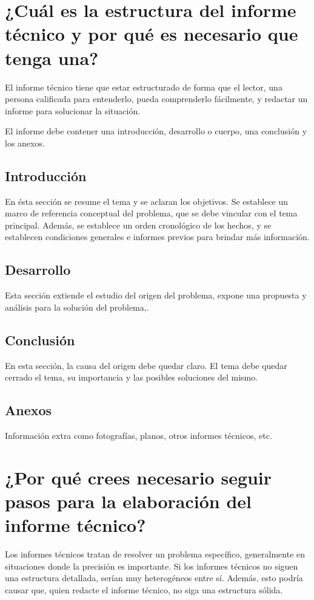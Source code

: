 \documentclass{article}
\begin{document}
\section{¿Cuál es la estructura del informe técnico y por qué es necesario que tenga una?}
El informe técnico tiene que estar estructurado de forma que el lector, una
persona calificada para entenderlo, pueda comprenderlo fácilmente, y redactar
un informe para solucionar la situación.

El informe debe contener una introducción, desarrollo o cuerpo, una conclusión
y los anexos.

\subsection{Introducción}
En ésta sección se resume el tema y se aclaran los objetivos. Se establece un
marco de referencia conceptual del problema, que se debe vincular con el tema
principal. Además, se establece un orden cronológico de los hechos, y se
establecen condiciones generales e informes previos para brindar más
información.

\subsection{Desarrollo}
Esta sección extiende el estudio del origen del problema, expone una propuesta
y análisis para la solución del problema,.

\subsection{Conclusión}
En esta sección, la causa del origen debe quedar claro. El tema debe quedar
cerrado el tema, su importancia y las posibles soluciones del mismo.

\subsection{Anexos}
Información extra como fotografías, planos, otros informes técnicos, etc.

\section{¿Por qué crees necesario seguir pasos para la elaboración del informe técnico?}
Los informes técnicos tratan de resolver un problema específico, generalmente
en situaciones donde la precisión es importante. Si los informes técnicos no
siguen una estructura detallada, serían muy heterogéneos entre sí. Además, esto
podría causar que, quien redacte el informe técnico, no siga una estructura
sólida.
\end{document}
